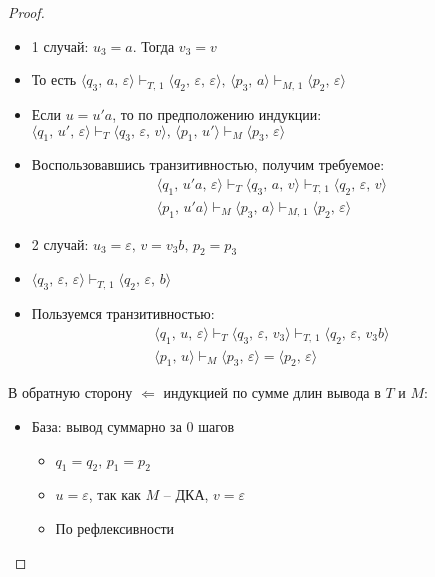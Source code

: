 \documentclass[a4paper,12pt]{article}
\theoremstyle{plain}
\theoremstyle{definition}
\theoremstyle{remark}
\begin{document}
\begin{proof}
\begin{itemize}
		      \begin{itemize}
			      \item 1 случай: $u_3 = a$. Тогда $v_3 = v$
			      \item То есть $\langle q_3,\,a,\,\varepsilon\rangle\vdash_{T,\,1}\langle q_2,\,\varepsilon,\,\varepsilon\rangle,\,\langle p_3,\,a\rangle\vdash_{M,\,1}\langle p_2,\,\varepsilon\rangle$
			      \item Если $u = u'a$, то по предположению индукции: $\langle q_1,\,u',\,\varepsilon\rangle\vdash_T\langle q_3,\,\varepsilon,\,v\rangle,\,\langle p_1,\,u'\rangle\vdash_M\langle p_3,\,\varepsilon\rangle$
			      \item Воспользовавшись транзитивностью, получим требуемое:
			            \begin{align*}
				            \langle q_1,\,u'a,\,\varepsilon\rangle\vdash_T\langle q_3,\,a,\,v\rangle\vdash_{T,\,1}\langle q_2,\,\varepsilon,\,v\rangle \\
				            \langle p_1,\,u'a\rangle\vdash_M\langle p_3,\,a\rangle\vdash_{M,\,1}\langle p_2,\,\varepsilon\rangle
			            \end{align*}
			      \item 2 случай: $u_3 = \varepsilon,\,v = v_3b,\, p_2 = p_3$
			      \item $\langle q_3,\,\varepsilon,\,\varepsilon\rangle\vdash_{T,\,1}\langle q_2,\,\varepsilon,\,b\rangle$
			      \item Пользуемся транзитивностью:
			            \begin{align*}
				            \langle q_1,\,u,\,\varepsilon\rangle\vdash_T\langle q_3,\,\varepsilon,\,v_3\rangle\vdash_{T,\,1}\langle q_2,\,\varepsilon,\, v_3b\rangle \\
				            \langle p_1,\,u\rangle\vdash_M\langle p_3,\,\varepsilon\rangle=\langle p_2,\,\varepsilon\rangle
			            \end{align*}
		      \end{itemize}
	\end{itemize}
	В обратную сторону $\Leftarrow$ индукцией по сумме длин вывода в $T$ и $M$:
	\begin{itemize}
		\item База: вывод суммарно за 0 шагов
		      \begin{itemize}
			      \item $q_1 = q_2,\, p_1 = p_2$
			      \item $u = \varepsilon$, так как $M$ -- ДКА, $v = \varepsilon$
			      \item По рефлексивности

\end{itemize}
\end{itemize}
\end{proof}
\end{document}
